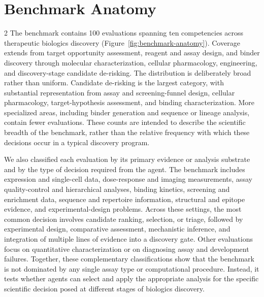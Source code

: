 \documentclass[10pt,letterpaper]{article}
\begin{document}
{\fontsize{9.1}{12.8}\selectfont
\section{Benchmark Anatomy}

\begin{multicols}{2}
The benchmark contains 100 evaluations spanning ten competencies across therapeutic biologics discovery (Figure~\ref{fig:benchmark-anatomy}). Coverage extends from target opportunity assessment, reagent and assay design, and binder discovery through molecular characterization, cellular pharmacology, engineering, and discovery-stage candidate de-risking. The distribution is deliberately broad rather than uniform. Candidate de-risking is the largest category, with substantial representation from assay and screening-funnel design, cellular pharmacology, target-hypothesis assessment, and binding characterization. More specialized areas, including binder generation and sequence or lineage analysis, contain fewer evaluations. These counts are intended to describe the scientific breadth of the benchmark, rather than the relative frequency with which these decisions occur in a typical discovery program.
\par
We also classified each evaluation by its primary evidence or analysis substrate and by the type of decision required from the agent. The benchmark includes expression and single-cell data, dose-response and imaging measurements, assay quality-control and hierarchical analyses, binding kinetics, screening and enrichment data, sequence and repertoire information, structural and epitope evidence, and experimental-design problems. Across these settings, the most common decision involves candidate ranking, selection, or triage, followed by experimental design, comparative assessment, mechanistic inference, and integration of multiple lines of evidence into a discovery gate. Other evaluations focus on quantitative characterization or on diagnosing assay and development failures. Together, these complementary classifications show that the benchmark is not dominated by any single assay type or computational procedure. Instead, it tests whether agents can select and apply the appropriate analysis for the specific scientific decision posed at different stages of biologics discovery.

\par
\end{multicols}
}
\end{document}
